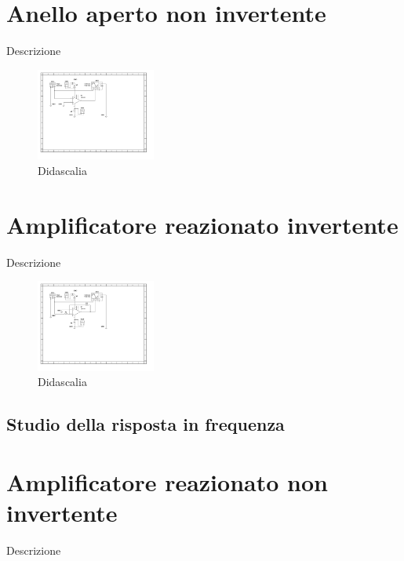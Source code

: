 \documentclass[journal]{IEEEtran}
\begin{document}
\section{\textbf{Anello aperto non invertente}} %
Descrizione

\begin{figure}[H]%
\begin {center}
\includegraphics[width=0.35\textwidth]{sch-simulations/output/OPA-open-loop-non-inverting.pdf}
\caption{Didascalia}
\label{fig:oscilloscope}
\end {center}
\end{figure}


\section{\textbf{Amplificatore reazionato invertente}} %
Descrizione

\begin{figure}[H]%
\begin {center}
\includegraphics[width=0.35\textwidth]{sch-simulations/output/OPA-closed-loop-inverting.pdf}
\caption{Didascalia}
\label{fig:oscilloscope}
\end {center}
\end{figure}

\subsection{Studio della risposta in frequenza}


\section{\textbf{Amplificatore reazionato non invertente}} %
Descrizione
\end{document}
